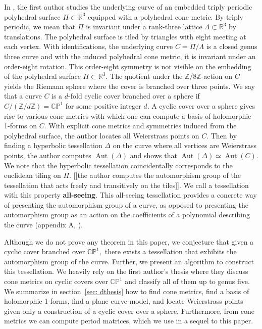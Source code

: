 \documentclass[12pt,reqno]{amsart}
\DeclareMathOperator{\Aut}{Aut}
\newcommand{\Z}{\mathbb{Z}}
\newcommand{\R}{\mathbb{R}}
\theoremstyle{definition}
\theoremstyle{remark}
\begin{document}
In \cite{dami}, the first author studies the underlying curve of an embedded triply periodic polyhedral surface $\Pi \subset \R^3$ equipped with a polyhedral cone metric. By triply periodic, we mean that $\Pi$ is invariant under a rank-three lattice $\Lambda \subset \R^3$ by translations. The polyhedral surface is tiled by triangles with eight meeting at each vertex. With identifications, the underlying curve $C = \Pi / \Lambda$ is a closed genus three curve and with the induced polyhedral cone metric, it is invariant under an order-eight rotation. This order-eight symmetry is not visible on the embedding of the polyhedral surface $\Pi \subset \R^3.$ The quotient under the $\Z/ 8 \Z$-action on $C$ yields the Riemann sphere where the cover is branched over three points. We say that a curve $C$ is a $d$-fold cyclic cover branched over a sphere if $C / (\Z / d \Z) = \mathbb{C}\mathbb{P}^1$ for some positive integer $d.$ A cyclic cover over a sphere gives rise to various cone metrics with which one can compute a basis of holomorphic 1-forms on $C.$ With explicit cone metrics and symmetries induced from the polyhedral surface, the author locates all Weierstrass points on $C.$ Then by finding a hyperbolic tessellation $\Delta$ on the curve where all vertices are Weierstrass points, the author computes $\Aut(\Delta)$ and shows that $\Aut(\Delta) \simeq \Aut(C)$. We note that the hyperbolic tessellation coincidentally corresponds to the euclidean tiling on $\Pi.$ [[the author computes the automorphism group of the tessellation that acts freely and transitively on the tiles]]. We call a tessellation with this property \textbf{all-seeing}. This all-seeing tessellation provides a concrete way of presenting the automorphism group of a curve, as opposed to presenting the automorphism group as an action on the coefficients of a polynomial describing the curve (appendix A, \cite{silverman}). %

Although we do not prove any theorem in this paper, we conjecture that given a cyclic cover branched over $\mathbb{C}\mathbb{P}^1,$ there exists a tessellation that exhibits the automorphism group of the curve. Further, we present an algorithm to construct this tessellation. We heavily rely on the first author's thesis \cite{dthesis} where they discuss cone metrics on cyclic covers over $\mathbb{C}\mathbb{P}^1$ and classify all of them up to genus five. We summarize in section~\ref{sec: dthesis} how to find cone metrics, find a basis of holomorphic 1-forms, find a plane curve model, and locate Weierstrass points given only a construction of a cyclic cover over a sphere. Furthermore, from cone metrics we can compute period matrices, which we use in a sequel to this paper. 
\end{document}
